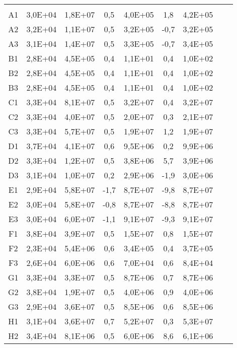 \begin{center}
\begin{longtable}{ccccccccc}
\toprule
\endhead
\midrule \\ %
\endfoot
\bottomrule 
\endlastfoot
A1    & 3,0E+04 & 1,8E+07 & 0,5   & 4,0E+05 & 1,8   & 4,2E+05 \\
A2    & 3,2E+04 & 1,1E+07 & 0,5   & 3,2E+05 & -0,7  & 3,2E+05 \\
A3    & 3,1E+04 & 1,4E+07 & 0,5   & 3,3E+05 & -0,7  & 3,4E+05 \\
B1    & 2,8E+04 & 4,5E+05 & 0,4   & 1,1E+01 & 0,4   & 1,0E+02 \\
B2    & 2,8E+04 & 4,5E+05 & 0,4   & 1,1E+01 & 0,4   & 1,0E+02 \\
B3    & 2,8E+04 & 4,5E+05 & 0,4   & 1,1E+01 & 0,4   & 1,0E+02 \\
C1    & 3,3E+04 & 8,1E+07 & 0,5   & 3,2E+07 & 0,4   & 3,2E+07 \\
C2    & 3,3E+04 & 4,0E+07 & 0,5   & 2,0E+07 & 0,3   & 2,1E+07 \\
C3    & 3,3E+04 & 5,7E+07 & 0,5   & 1,9E+07 & 1,2   & 1,9E+07 \\
D1    & 3,7E+04 & 4,1E+07 & 0,6   & 9,5E+06 & 0,2   & 9,9E+06 \\
D2    & 3,3E+04 & 1,2E+07 & 0,5   & 3,8E+06 & 5,7   & 3,9E+06 \\
D3    & 3,1E+04 & 1,0E+07 & 0,2   & 2,9E+06 & -1,9  & 3,0E+06 \\
E1    & 2,9E+04 & 5,8E+07 & -1,7  & 8,7E+07 & -9,8  & 8,7E+07 \\
E2    & 3,0E+04 & 5,8E+07 & -0,8  & 8,7E+07 & -8,8  & 8,7E+07 \\
E3    & 3,0E+04 & 6,0E+07 & -1,1  & 9,1E+07 & -9,3  & 9,1E+07 \\
F1    & 3,8E+04 & 3,9E+07 & 0,5   & 1,5E+07 & 0,8   & 1,5E+07 \\
F2    & 2,3E+04 & 5,4E+06 & 0,6   & 3,4E+05 & 0,4   & 3,7E+05 \\
F3    & 2,6E+04 & 6,0E+06 & 0,6   & 7,0E+04 & 0,6   & 8,4E+04 \\
G1    & 3,3E+04 & 3,3E+07 & 0,5   & 8,7E+06 & 0,7   & 8,7E+06 \\
G2    & 3,8E+04 & 1,9E+07 & 0,5   & 4,0E+06 & 0,9   & 4,0E+06 \\
G3    & 2,9E+04 & 3,6E+07 & 0,5   & 8,5E+06 & 0,6   & 8,5E+06 \\
H1    & 3,1E+04 & 3,6E+07 & 0,7   & 5,2E+07 & 0,3   & 5,3E+07 \\
H2    & 3,4E+04 & 8,1E+06 & 0,5   & 6,0E+06 & 8,6   & 6,1E+06 \\

\end{longtable}
\end{center}

